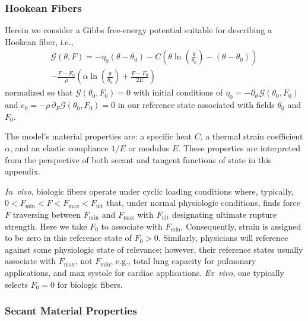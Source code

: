 \subsubsection{Hookean Fibers}

Herein we consider a Gibbs free-energy potential suitable for describing a Hookean fiber, i.e.,
\begin{multline}
    \mathcal{G} (\theta , F) = -\eta_0 (\theta - \theta_0) -
    C \left( \theta \ln \left( \frac{\theta}{\theta_0} \right) - (\theta - \theta_0) \right) \\ - 
    \frac{F - F_0}{\rho} \left( \alpha \ln \left( \frac{\theta}{\theta_0} \right) + \frac{F - F_0}{2E}  \right)
    \label{GreenFiberEnergy}
\end{multline}
normalized so that $\mathcal{G}(\theta_0 , F_0) = 0$ with initial conditions of $\eta_0 = -\partial_{\theta\,} \mathcal{G} (\theta_0 , F_0)$ and $e_0 = -\rho \, \partial_F \mathcal{G} (\theta_0 , F_0) = 0$ in our reference state associated with fields $\theta_0$ and $F_0$.   

The model's material properties are: a specific heat $C$, a thermal strain coefficient $\alpha$, and an elastic compliance $1/E$ or modulus $E$.  These properties are interpreted from the perspective of both secant and tangent functions of state in this appendix.

\textit{In~vivo}, biologic fibers operate under cyclic loading conditions where, typically, \mbox{$0 < F_{\min} < F < F_{\max} < F_{\mathrm{ult}}$} that, under normal physiologic conditions, finds force $F$ traversing between $F_{\min}$ and $F_{\max}$ with $F_{\mathrm{ult}}$ designating ultimate rupture strength.  Here we take $F_0$ to associate with $F_{\min}$.  Consequently, strain is assigned to be zero in this reference state of $F_0>0$.  Similarly, physicians will reference against some physiologic state of relevance; however, their reference states usually associate with $F_{\max}$, not $F_{\min}$, e.g., total lung capacity for pulmonary applications, and max systole for cardiac applications.  \textit{Ex~vivo}, one typically selects $F_0 = 0$ for biologic fibers.

\subsubsection{Secant Material Properties}

